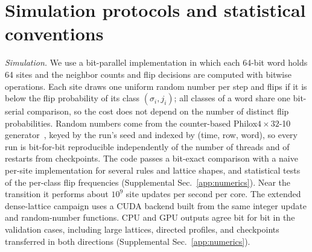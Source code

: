 \section{Simulation protocols and statistical conventions}
\label{sec:protocols}

\textit{Simulation.} We use a bit-parallel implementation in which each 64-bit word holds 64
sites and the neighbor counts and flip decisions are computed with bitwise operations. Each site
draws one uniform random number per step and flips if it is below the flip probability of its
class $(\sigma_i, j_i)$; all classes of a word share one bit-serial comparison, so the cost does
not depend on the number of distinct flip probabilities. Random numbers come from the
counter-based Philox$4\times 32$-10 generator~\cite{salmon2011}, keyed by the run's seed and
indexed by (time, row, word), so every run is bit-for-bit reproducible independently of the
number of threads and of restarts from checkpoints. The code passes a bit-exact comparison with a
naive per-site implementation for several rules and lattice shapes, and statistical tests of
the per-class flip frequencies (Supplemental Sec.~\ref{app:numerics}). Near the transition it performs
about $10^9$ site updates per second per core. The extended dense-lattice
campaign uses a CUDA backend built from the same integer update and random-number
functions. CPU and GPU outputs agree bit for bit in the validation cases,
including large lattices, directed profiles, and checkpoints transferred in
both directions (Supplemental Sec.~\ref{app:numerics}).

